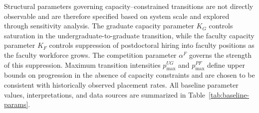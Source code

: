 \documentclass[3p]{elsarticle}%
\theoremstyle{definition}
\begin{document}
 \noindent Structural parameters governing capacity--constrained transitions are not directly observable and are therefore specified based on system scale and explored through sensitivity analysis. The graduate capacity parameter $K_G$ controls saturation in the undergraduate-to-graduate transition, while the faculty capacity parameter $K_F$ controls suppression of postdoctoral hiring into faculty positions as the faculty workforce grows. The competition parameter $\alpha^F$ governs the strength of this suppression. Maximum transition intensities $p_{\max}^{UG}$ and $p_{\max}^{PF}$ define upper bounds on progression in the absence of capacity constraints and are chosen to be consistent with historically observed placement rates. All baseline parameter values, interpretations, and data sources are summarized in Table~\ref{tab:baseline-params}.
\vspace{5mm}
\end{document}
